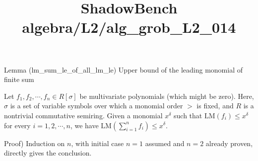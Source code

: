 \documentclass{article}
\title{ShadowBench algebra/L2/alg\_grob\_L2\_014}
\begin{document}
\maketitle

Lemma (lm_sum_le_of_all_lm_le)
Upper bound of the leading monomial of finite sum

Let $f_1, f_2, \cdots, f_n \in R[\sigma]$ be multivariate polynomials (which might be zero). Here, $\sigma$ is a set of variable symbols over which a monomial order $>$ is fixed, and $R$ is a nontrivial commutative semiring. Given a monomial $x^\delta$ such that $\mathrm{LM}(f_i) \le x^\delta$ for every $i = 1, 2, \cdots, n$, we have $\mathrm{LM}(\sum_{i=1}^n f_i) \le x^\delta$.

Proof)
Induction on $n$, with initial case $n = 1$ assumed and $n = 2$ already proven, directly gives the conclusion.
\end{document}
